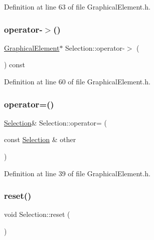 Definition at line 63 of file Graphical\+Element.\+h.

\mbox{\label{struct_selection_a73967a05efebc0e6fe55dd04b0d07fe0}} 
\subsubsection{\texorpdfstring{operator-\/$>$()}{operator->()}}
{\footnotesize\ttfamily \hyperlink{class_graphical_element}{Graphical\+Element}$\ast$ Selection\+::operator-\/$>$ (\begin{DoxyParamCaption}{ }\end{DoxyParamCaption}) const\hspace{0.3cm}{\ttfamily [inline]}}



Definition at line 60 of file Graphical\+Element.\+h.

\mbox{\label{struct_selection_a83565714b5bc3062d9504ad235a42143}} 
\subsubsection{\texorpdfstring{operator=()}{operator=()}}
{\footnotesize\ttfamily \hyperlink{struct_selection}{Selection}\& Selection\+::operator= (\begin{DoxyParamCaption}\item[{const \hyperlink{struct_selection}{Selection} \&}]{other }\end{DoxyParamCaption})\hspace{0.3cm}{\ttfamily [inline]}}



Definition at line 39 of file Graphical\+Element.\+h.

\mbox{\label{struct_selection_a15280d931dd5c83c2ab2554254f5248d}} 
\subsubsection{\texorpdfstring{reset()}{reset()}}
{\footnotesize\ttfamily void Selection\+::reset (\begin{DoxyParamCaption}{ }\end{DoxyParamCaption})\hspace{0.3cm}{\ttfamily [inline]}}



